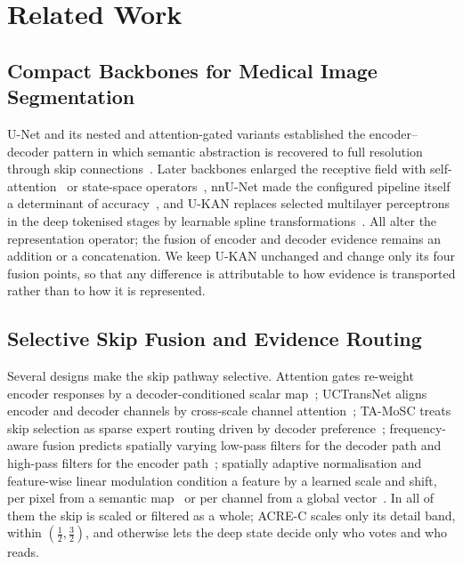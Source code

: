 \section{Related Work}
\label{sec:related}

\subsection{Compact Backbones for Medical Image Segmentation}

U-Net and its nested and attention-gated variants established the encoder--decoder pattern in which semantic abstraction is recovered to full resolution through skip connections~\cite{ronneberger2015unet,zhou2020unetpp,oktay2018attention}. Later backbones enlarged the receptive field with self-attention~\cite{chen2021transunet,cao2023swinunet} or state-space operators~\cite{ruan2024umamba}, nnU-Net made the configured pipeline itself a determinant of accuracy~\cite{isensee2021nnunet}, and U-KAN replaces selected multilayer perceptrons in the deep tokenised stages by learnable spline transformations~\cite{li2025ukan}. All alter the representation operator; the fusion of encoder and decoder evidence remains an addition or a concatenation. We keep U-KAN unchanged and change only its four fusion points, so that any difference is attributable to how evidence is transported rather than to how it is represented.

\subsection{Selective Skip Fusion and Evidence Routing}

Several designs make the skip pathway selective. Attention gates re-weight encoder responses by a decoder-conditioned scalar map~\cite{oktay2018attention}; UCTransNet aligns encoder and decoder channels by cross-scale channel attention~\cite{wang2022uctransnet}; TA-MoSC treats skip selection as sparse expert routing driven by decoder preference~\cite{luo2025tamosc}; frequency-aware fusion predicts spatially varying low-pass filters for the decoder path and high-pass filters for the encoder path~\cite{chen2025freqfusion}; spatially adaptive normalisation and feature-wise linear modulation condition a feature by a learned scale and shift, per pixel from a semantic map~\cite{park2019spade} or per channel from a global vector~\cite{perez2018film}. In all of them the skip is scaled or filtered as a whole; ACRE-C scales only its detail band, within $(\tfrac12,\tfrac32)$, and otherwise lets the deep state decide only who votes and who reads.


